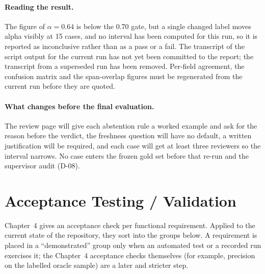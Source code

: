 \paragraph{Reading the result.} The figure of $\alpha = 0.64$ is below the 0.70
gate, but a single changed label moves alpha visibly at 15 cases, and no
interval has been computed for this run, so it is reported as inconclusive
rather than as a pass or a fail. The transcript of the script output for the
current run has not yet been committed to the report; the transcript from a
superseded run has been removed. Per-field agreement, the confusion matrix and the span-overlap figures must be
regenerated from the current run before they are quoted.

\paragraph{What changes before the final evaluation.} The review page will
give each abstention rule a worked example and ask for the reason before the
verdict, the freshness question will have no default, a written justification
will be required, and each case will get at least three reviewers so the
interval narrows. No case enters the frozen gold set before that re-run and the
supervisor audit (D-08).

\section{Acceptance Testing / Validation}
\label{sec:acceptance-testing}

Chapter~4 gives an acceptance check per functional requirement. Applied to the
current state of the repository, they sort into the groups below. A requirement
is placed in a ``demonstrated'' group only when an automated test or a recorded
run exercises it; the Chapter~4 acceptance checks themselves (for example,
precision on the labelled oracle sample) are a later and stricter step.

